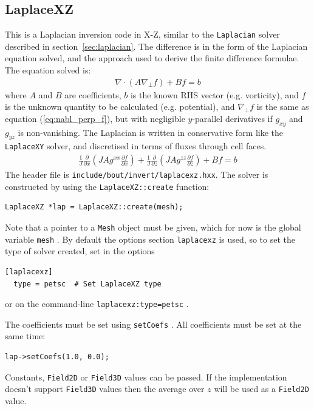 \documentclass[12pt]{article}
\begin{document}
\subsection{LaplaceXZ}
%
\label{sec:LaplaceXZ}
%
This is a Laplacian inversion code in X-Z, similar to the \texttt{Laplacian}
solver described in section~\ref{sec:laplacian}.  The difference is in the form
of the Laplacian equation solved, and the approach used to derive the finite
difference formulae.  The equation solved is:
%
\begin{align*}
  \nabla\cdot\left( A \nabla_\perp f \right) + Bf = b
\end{align*}
%
where $A$ and $B$ are coefficients, $b$ is the known RHS vector (e.g.
vorticity), and $f$ is the unknown quantity to be calculated (e.g. potential),
and $\nabla_\perp f$ is the same as equation (\ref{eq:nabl_perp_f}), but with
negligible $y$-parallel derivatives if $g_{xy}$ and $g_{yz}$ is non-vanishing.
The Laplacian is written in conservative form like the \texttt{LaplaceXY}
solver, and discretised in terms of fluxes through cell faces.
%
\begin{align*}
  \frac{1}{J}\frac{\partial}{\partial x}\left(J A g^{xx}\frac{\partial
  f}{\partial x}\right) + \frac{1}{J}\frac{\partial}{\partial z}\left(J A
  g^{zz}\frac{\partial f}{\partial z}\right) + B f = b
\end{align*}
%
The header file is \texttt{include/bout/invert/laplacexz.hxx}. The solver is
constructed by using the \texttt{LaplaceXZ::create} function:
%
\begin{lstlisting}[numbers=none]
  LaplaceXZ *lap = LaplaceXZ::create(mesh);
\end{lstlisting}
%
Note that a pointer to a \texttt{Mesh} object must be given, which for now is
the global variable
%
\lstinline!mesh!
%
.  By default the options section \texttt{laplacexz} is used, so to set the
type of solver created, set in the options
%
\begin{lstlisting}[numbers=none]
  [laplacexz]
  type = petsc  # Set LaplaceXZ type
\end{lstlisting}
%
or on the command-line
%
\lstinline!laplacexz:type=petsc!
%
.

The coefficients must be set using
%
\lstinline!setCoefs!
%
. All coefficients must be set at the same time:
%
\begin{lstlisting}[numbers=none]
  lap->setCoefs(1.0, 0.0);
\end{lstlisting}
%
Constants,
%
\lstinline!Field2D! or \lstinline!Field3D!
%
 values can be passed.  If the implementation doesn't support
%
\lstinline!Field3D!
%
 values then the average over $z$ will be used as a
%
\lstinline!Field2D!
%
 value.
\end{document}
